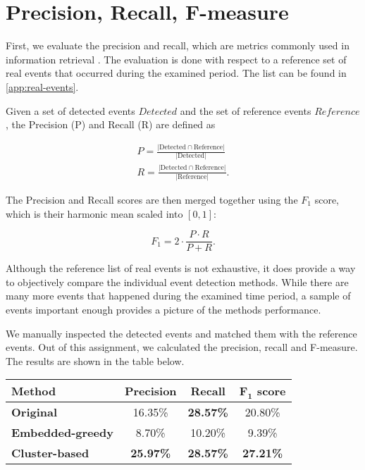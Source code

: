 \section{Precision, Recall, F-measure}

First, we evaluate the precision and recall, which are metrics commonly used in information retrieval \citep{information-retrieval, information-retrieval-2}. The evaluation is done with respect to a reference set of real events that occurred during the examined period. The list can be found in \autoref{app:real-events}.

Given a set of detected events $\mathit{Detected}$ and the set of reference events $\mathit{Reference}$, the Precision (P) and Recall (R) are defined as

\begin{equation}
\begin{alignedat}{-1}
	P = \frac{\left| \text{Detected} \cap \text{Reference} \right|}{\left| \text{Detected} \right|}\\
	R = \frac{\left| \text{Detected} \cap \text{Reference} \right|}{\left| \text{Reference} \right|}.
\end{alignedat}
\end{equation}

The Precision and Recall scores are then merged together using the $F_{1}$ score, which is their harmonic mean scaled into $[0, 1]$:

\begin{equation}
	F_{1} = 2 \cdot \frac{P \cdot R}{P + R}.
\end{equation}

Although the reference list of real events is not exhaustive, it does provide a way to objectively compare the individual event detection methods. While there are many more events that happened during the examined time period, a sample of events important enough provides a picture of the methods performance.

We manually inspected the detected events and matched them with the reference events. Out of this assignment, we calculated the precision, recall and F-measure. The results are shown in the table below.

\hspace{\fill}

\begin{minipage}{\linewidth}
\centering
\begin{tabular}{ l c c c }\toprule[1.5pt]
\bf Method 	 & \bf Precision & \bf Recall & \bf $\mathbf{F_{1}}$ score \\ \midrule
\bf Original &  16.35\%     & \bf 28.57\%     &  20.80\% \\
\bf Embedded-greedy   &  8.70\%     & 10.20\%      &  9.39\% \\
\bf Cluster-based &  \bf 25.97\%     & \bf 28.57\%      & \bf 27.21\% \\ \bottomrule[1.25pt]
\end {tabular}\par
{} \label{tab:title}
\end{minipage}

